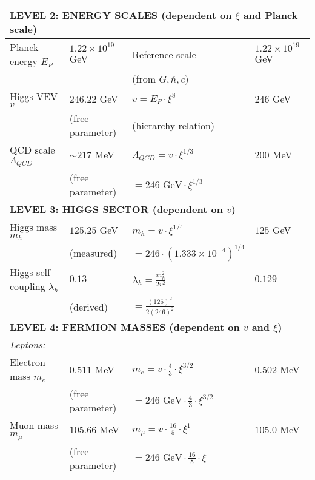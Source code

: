 \documentclass[12pt,a4paper]{article}
\begin{document}
\begin{longtable}{p{5cm}p{4cm}p{3.5cm}p{3.5cm}}
	\midrule
	\multicolumn{4}{l}{\textbf{LEVEL 2: ENERGY SCALES (dependent on $\xi$ and Planck scale)}} \\
	\midrule
	
	Planck energy $E_P$ & $1.22 \times 10^{19}$ GeV & Reference scale & $1.22 \times 10^{19}$ GeV \\
	& & (from $G, \hbar, c$) & \\[0.3em]
	
	Higgs VEV $v$ & $246.22$ GeV & $v = E_P \cdot \xi^{8}$ & $246$ GeV \\
	& (free parameter) & (hierarchy relation) & \\[0.3em]
	
	QCD scale $\Lambda_{QCD}$ & $\sim 217$ MeV & $\Lambda_{QCD} = v \cdot \xi^{1/3}$ & $200$ MeV \\
	& (free parameter) & $= 246 \text{ GeV} \cdot \xi^{1/3}$ & \\[0.3em]
	
	\midrule
	\multicolumn{4}{l}{\textbf{LEVEL 3: HIGGS SECTOR (dependent on $v$)}} \\
	\midrule
	
	Higgs mass $m_h$ & $125.25$ GeV & $m_h = v \cdot \xi^{1/4}$ & $125$ GeV \\
	& (measured) & $= 246 \cdot (1.333 \times 10^{-4})^{1/4}$ & \\[0.3em]
	
	Higgs self-coupling $\lambda_h$ & $0.13$ & $\lambda_h = \frac{m_h^2}{2v^2}$ & $0.129$ \\
	& (derived) & $= \frac{(125)^2}{2(246)^2}$ & \\[0.3em]
	
	\midrule
	\multicolumn{4}{l}{\textbf{LEVEL 4: FERMION MASSES (dependent on $v$ and $\xi$)}} \\
	\midrule
	
	\multicolumn{4}{l}{\textit{Leptons:}} \\
	
	Electron mass $m_e$ & $0.511$ MeV & $m_e = v \cdot \frac{4}{3} \cdot \xi^{3/2}$ & $0.502$ MeV \\
	& (free parameter) & $= 246 \text{ GeV} \cdot \frac{4}{3} \cdot \xi^{3/2}$ & \\[0.3em]
	
	Muon mass $m_\mu$ & $105.66$ MeV & $m_\mu = v \cdot \frac{16}{5} \cdot \xi^1$ & $105.0$ MeV \\
	& (free parameter) & $= 246 \text{ GeV} \cdot \frac{16}{5} \cdot \xi$ & \\[0.3em]
	

\end{longtable}
\end{document}
